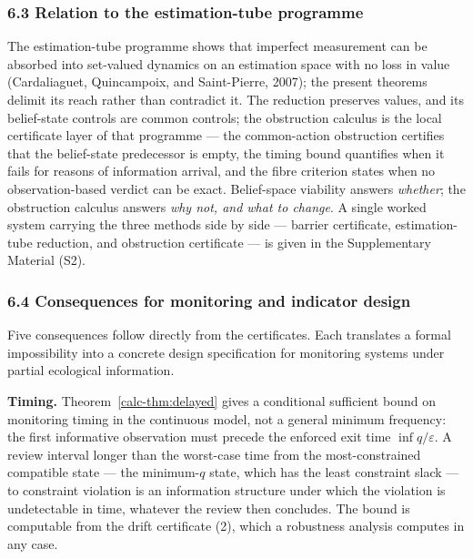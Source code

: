 \documentclass[10pt,twocolumn]{article}
\theoremstyle{definition}
\begin{document}
\subsubsection{6.3 Relation to the estimation-tube
programme}\label{calc-relation-to-the-estimation-tube-programme}

The estimation-tube programme shows that imperfect measurement can be absorbed into set-valued dynamics on an estimation space with no loss in value (Cardaliaguet, Quincampoix, and Saint-Pierre, 2007); the present theorems delimit its reach rather than contradict it. The reduction preserves values, and its belief-state controls are common controls; the obstruction calculus is the local certificate layer of that programme --- the common-action obstruction certifies that the belief-state predecessor is empty, the timing bound quantifies when it fails for reasons of information arrival, and the fibre criterion states when no observation-based verdict can be exact. Belief-space viability answers \emph{whether}; the obstruction calculus answers \emph{why not, and what to change}. A single worked system carrying the three methods side by side --- barrier certificate, estimation-tube reduction, and obstruction certificate --- is given in the Supplementary Material (S2).

\subsubsection{6.4 Consequences for monitoring and indicator
design}\label{calc-consequences-for-monitoring-and-indicator-design}



Five consequences follow directly from the certificates. Each translates
a formal impossibility into a concrete design specification for
monitoring systems under partial ecological information.

\textbf{Timing.} Theorem~\ref{calc-thm:delayed} gives a conditional sufficient bound on
monitoring timing in the continuous model, not a general minimum frequency: the first informative observation must precede the enforced
exit time \(\inf q / \varepsilon\). A review interval longer than the
worst-case time from the most-constrained compatible state --- the
minimum-\(q\) state, which has the least constraint slack --- to
constraint violation is an information structure under which the
violation is undetectable in time, whatever the review then concludes.
The bound is computable from the drift certificate (2), which a robustness analysis computes in any case.
\end{document}
